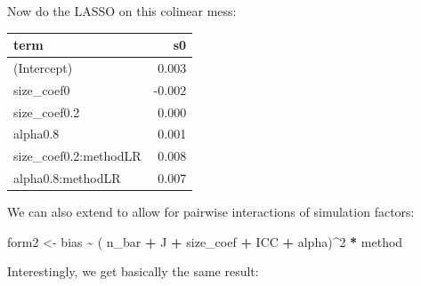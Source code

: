 \documentclass[
]{book}
\newenvironment{Shaded}{\begin{snugshade}}{\end{snugshade}}
\newcommand{\AttributeTok}[1]{\textcolor[rgb]{0.13,0.29,0.53}{#1}}
\newcommand{\DecValTok}[1]{\textcolor[rgb]{0.00,0.00,0.81}{#1}}
\newcommand{\FunctionTok}[1]{\textcolor[rgb]{0.13,0.29,0.53}{\textbf{#1}}}
\newcommand{\NormalTok}[1]{#1}
\newcommand{\OtherTok}[1]{\textcolor[rgb]{0.56,0.35,0.01}{#1}}
\newcommand{\SpecialCharTok}[1]{\textcolor[rgb]{0.81,0.36,0.00}{\textbf{#1}}}
\newcommand{\StringTok}[1]{\textcolor[rgb]{0.31,0.60,0.02}{#1}}
\begin{document}
Now do the LASSO on this colinear mess:

\begin{Shaded}
\end{Shaded}

\begin{tabular}{l|r}
\hline
term & s0\\
\hline
(Intercept) & 0.003\\
\hline
size\_coef0 & -0.002\\
\hline
size\_coef0.2 & 0.000\\
\hline
alpha0.8 & 0.001\\
\hline
size\_coef0.2:methodLR & 0.008\\
\hline
alpha0.8:methodLR & 0.007\\
\hline
\end{tabular}

We can also extend to allow for pairwise interactions of simulation factors:

\begin{Shaded}
\begin{Highlighting}[]
\NormalTok{form2 }\OtherTok{\textless{}{-}}\NormalTok{ bias }\SpecialCharTok{\textasciitilde{}}\NormalTok{ ( n\_bar }\SpecialCharTok{+}\NormalTok{ J }\SpecialCharTok{+}\NormalTok{ size\_coef }\SpecialCharTok{+}\NormalTok{ ICC }\SpecialCharTok{+}\NormalTok{ alpha)}\SpecialCharTok{\^{}}\DecValTok{2} \SpecialCharTok{*}\NormalTok{ method}
\end{Highlighting}
\end{Shaded}

Interestingly, we get basically the same result:
\end{document}
